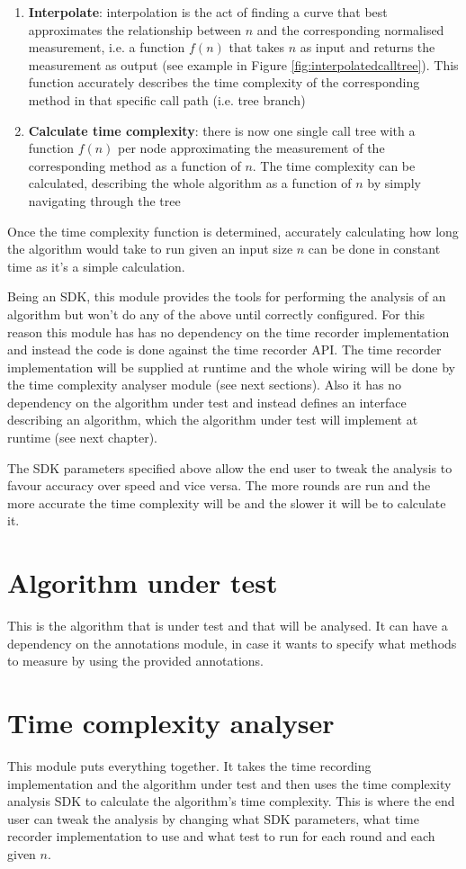 \begin{enumerate}
  \item \textbf{Interpolate}: interpolation is the act of finding a curve that best approximates the relationship between $n$ and the corresponding normalised measurement, i.e. a function $f(n)$ that takes $n$ as input and returns the measurement as output (see example in Figure \ref{fig:interpolatedcalltree}). This function accurately describes the time complexity of the corresponding method in that specific call path (i.e. tree branch)
  \item \textbf{Calculate time complexity}: there is now one single call tree with a function $f(n)$ per node approximating the measurement of the corresponding method as a function of $n$. The time complexity can be calculated, describing the whole algorithm as a function of $n$ by simply navigating through the tree
\end{enumerate}

\noindent Once the time complexity function is determined, accurately calculating how long the algorithm would take to run given an input size $n$ can be done in constant time as it's a simple calculation.

\noindent Being an SDK, this module provides the tools for performing the analysis of an algorithm but won't do any of the above until correctly configured. For this reason this module has  has no dependency on the time recorder implementation and instead the code is done against the time recorder API. The time recorder implementation will be supplied at runtime and the whole wiring will be done by the time complexity analyser module (see next sections). Also it has no dependency on the algorithm under test and instead defines an interface describing an algorithm, which the algorithm under test will implement at runtime (see next chapter).

\noindent The SDK parameters specified above allow the end user to tweak the analysis to favour accuracy over speed and vice versa. The more rounds are run and the more accurate the time complexity will be and the slower it will be to calculate it.

\section{Algorithm under test}
This is the algorithm that is under test and that will be analysed. It can have a dependency on the annotations module, in case it wants to specify what methods to measure by using the provided annotations.

\section{Time complexity analyser}
\label{sec:design:timecomplexityanalyser}
This module puts everything together. It takes the time recording implementation and the algorithm under test and then uses the time complexity analysis SDK to calculate the algorithm's time complexity. This is where the end user can tweak the analysis by changing what SDK parameters, what time recorder implementation to use and what test to run for each round and each given $n$.